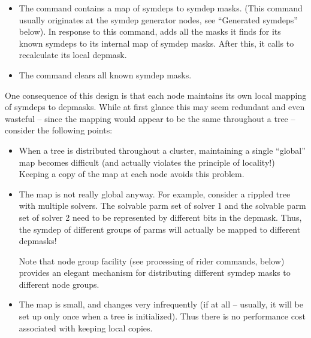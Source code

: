   \begin{itemize}
  
  \item The  command contains a map of symdeps to symdep
    masks. (This command usually originates at the symdep generator nodes, see
    ``Generated symdeps'' below). In response to this command,  adds
    all the masks it finds for its known symdeps to its internal map of symdep
    masks. After this, it calls  to recalculate its
    local depmask. 

  \item The  command clears all known symdep masks.
  
  \end{itemize}
  
  One consequence of this design is that each node maintains its own local
  mapping of symdeps to depmasks. While at first glance this may seem redundant
  and even wasteful -- since the mapping would appear to be the same throughout
  a tree -- consider the following points:

  \begin{itemize}
  
  \item When a tree is distributed throughout a cluster, maintaining a single
    ``global'' map becomes difficult (and actually violates the principle of
    locality!) Keeping a copy of the map at each node avoids this problem.

  \item The map is not really global anyway. For example, consider a rippled
    tree with multiple solvers. The solvable parm set of solver 1 and the
    solvable parm set of solver 2 need to be represented by different bits in
    the depmask. Thus, the  symdep of different groups of
    parms will actually be mapped to different depmasks!
    
    Note that node group facility (see processing of rider commands, below)
    provides an elegant mechanism for distributing different symdep masks to
    different node groups.
    
  \item The map is small, and changes very infrequently (if at all -- usually,
    it will be set up only once when a tree is initialized). Thus there is no
    performance cost associated with keeping local copies.

  \end{itemize}
  
